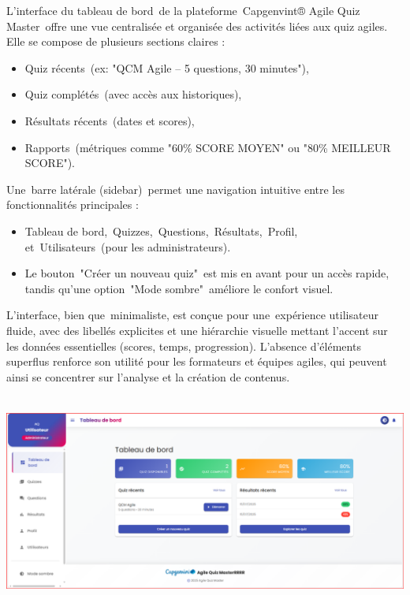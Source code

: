 \documentclass[12pt,a4paper,twoside,openright]{report}
\begin{document}
L'interface du tableau de bord~de la plateforme~Capgenvint® Agile Quiz
Master~offre une vue centralisée et organisée des activités liées aux
quiz agiles. Elle se compose de plusieurs sections claires :

\begin{itemize}
\item
  Quiz récents~(ex: "QCM Agile -- 5 questions, 30 minutes"),
\item
  Quiz complétés~(avec accès aux historiques),
\item
  Résultats récents~(dates et scores),
\item
  Rapports~(métriques comme "60\% SCORE MOYEN" ou "80\% MEILLEUR
  SCORE").
\end{itemize}

Une~barre latérale (sidebar)~permet une navigation intuitive entre les
fonctionnalités principales :

\begin{itemize}
\item
  Tableau de bord,~Quizzes,~Questions,~Résultats,~Profil,
  et~Utilisateurs~(pour les administrateurs).
\item
  Le bouton~"Créer un nouveau quiz"~est mis en avant pour un accès
  rapide, tandis qu'une option~"Mode sombre"~améliore le confort visuel.
\end{itemize}

L'interface, bien que~minimaliste, est conçue pour une~expérience
utilisateur fluide, avec des libellés explicites et une hiérarchie
visuelle mettant l'accent sur les données essentielles (scores, temps,
progression). L'absence d'éléments superflus renforce son utilité pour
les formateurs et équipes agiles, qui peuvent ainsi se concentrer sur
l'analyse et la création de contenus.

\includegraphics[width=6.3in,height=2.77986in]{latex_media/media/image52.png}
\end{document}
